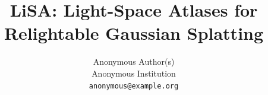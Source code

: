 \documentclass[10pt,twocolumn,letterpaper]{article}
\title{LiSA: Light-Space Atlases for Relightable Gaussian Splatting}
\author{Anonymous Author(s)\\
Anonymous Institution\\
{\tt\small anonymous@example.org}
}
\begin{document}
\maketitle








{
    \small
    
    
}

\end{document}
